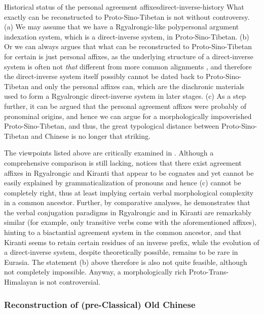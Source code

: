 \documentclass[UTF8, a4paper, oneside, scheme=plain, 12pt]{ctexrep}
\begin{document}
\begin{infobox}{Historical status of the personal agreement affixes}{direct-inverse-history}
    What exactly can be reconstructed to Proto-Sino-Tibetan is not without controversy.
    (a) We may assume that we have a Rgyalrongic-like polypersonal argument indexation system, which is a direct-inverse system, in Proto-Sino-Tibetan.
    (b) Or we can always argues that
    what can be reconstructed to Proto-Sino-Tibetan for certain is just personal affixes,
    as the underlying structure of a direct-inverse system is often not \emph{that}
    different from more common alignments \citep{oxford2017inverse},
    and therefore the direct-inverse system itself possibly cannot be dated back to Proto-Sino-Tibetan
    and only the personal affixes can,
    which are the diachronic materials used to form a Rgyalrongic direct-inverse system in later stages.
    (c) As a step further, it can be argued that the personal agreement affixes
    were probably of pronominal origins, 
    and hence we can argue for a morphologically impoverished Proto-Sino-Tibetan,
    and thus, the great typological distance between Proto-Sino-Tibetan and Chinese is no longer that striking.

    The viewpoints listed above are critically examined in \citet{jacques2012agreement}.
    Although a comprehensive comparison is still lacking,
    \citeauthor{jacques2012agreement} notices that 
    there exist agreement affixes in Rgyalrongic and Kiranti that appear to be cognates and yet cannot be easily explained by grammaticalization of pronouns and hence (c) cannot be completely right,
    thus at least implying certain verbal morphological complexity in a common ancestor.
    Further, by comparative analyses,
    he demonstrates that the verbal conjugation paradigms in Rgyalrongic and in Kiranti are remarkably similar
    (for example, only transitive verbs come with the aforementioned affixes),
    hinting to a biactantial agreement system in the common ancestor, and 
    that Kiranti seems to retain certain residues of an inverse prefix,
    while the evolution of a direct-inverse system, despite theoretically possible,
    remains to be rare in Eurasia.
    The statement (b) above therefore is also not quite feasible, although not completely impossible.
    Anyway, a morphologically rich Proto-Trans-Himalayan is not controversial.
\end{infobox}

\subsubsection{Reconstruction of (pre-Classical) Old Chinese}
\end{document}
